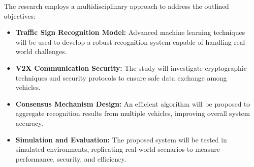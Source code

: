 The research employs a multidisciplinary approach to address the outlined objectives:
\begin{itemize}
    \item \textbf{Traffic Sign Recognition Model:} Advanced machine learning techniques will be used to develop a robust recognition system capable of handling real-world challenges.
    \item \textbf{V2X Communication Security:} The study will investigate cryptographic techniques and security protocols to ensure safe data exchange among vehicles.
    \item \textbf{Consensus Mechanism Design:} An efficient algorithm will be proposed to aggregate recognition results from multiple vehicles, improving overall system accuracy.
    \item \textbf{Simulation and Evaluation:} The proposed system will be tested in simulated environments, replicating real-world scenarios to measure performance, security, and efficiency.
\end{itemize}